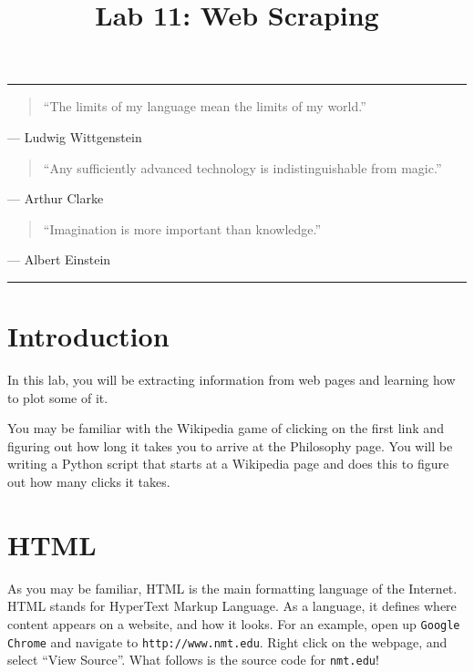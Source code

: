 \documentclass[11pt]{cselabheader}
\title{Lab 11: Web Scraping}
\begin{document}
\maketitle

\hrule
\begin{quotation}
``The limits of my language mean the limits of my world.''
\end{quotation}
\begin{flushright}
--- Ludwig Wittgenstein
\end{flushright}

\begin{quotation}
``Any sufficiently advanced technology is indistinguishable from magic.''
\end{quotation}
\begin{flushright}
--- Arthur Clarke
\end{flushright}

\begin{quotation}
``Imagination is more important than knowledge.''
\end{quotation}
\begin{flushright}
--- Albert Einstein
\end{flushright}

\hrule

\section{Introduction}

In this lab, you will be extracting information from web pages and learning how
to plot some of it.

You may be familiar with the Wikipedia game of clicking on the first link and
figuring out how long it takes you to arrive at the Philosophy page. You will be
writing a Python script that starts at a Wikipedia page and does this to figure
out how many clicks it takes.

\pagebreak

\section{HTML}

As you may be familiar, HTML is the main formatting language of the
Internet. HTML stands for HyperText Markup Language. As a language, it
defines where content appears on a website, and how it looks. For an
example, open up \texttt{Google Chrome} and navigate to
\texttt{http://www.nmt.edu}. Right click on the webpage, and select
``View Source''. What follows is the source code for \texttt{nmt.edu}!
\end{document}
